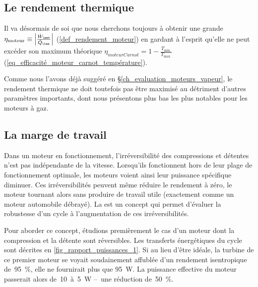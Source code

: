 	\subsection{Le rendement thermique}

		Il va désormais de soi que nous cherchons toujours à obtenir une grande  $\eta_\text{moteur} \equiv \left| \frac{\dot{W}_\net}{\dot{Q}_\inn} \right|$ (\ref{def_rendement_moteur}) en gardant à l’esprit qu’elle ne peut excéder son maximum théorique $\eta _{moteur Carnot} = 1 - \frac{T_\text{min.}}{T_\text{max.}}$ (\ref{eq_efficacité_moteur_carnot_température}).

		Comme nous l’avons déjà suggéré en \S\ref{ch_evaluation_moteurs_vapeur}, le rendement thermique ne doit toutefois pas être maximisé au détriment d’autres paramètres importants, dont nous présentons plus bas les plus notables pour les moteurs à gaz.

	\subsection{La marge de travail}
	\label{ch_rapport_des_puissances}

		Dans un moteur en fonctionnement, l’irréversibilité des compressions et détentes n’est pas indépendante de la vitesse. Lorsqu’ils fonctionnent hors de leur plage de fonctionnement optimale, les moteurs voient ainsi leur puissance spécifique diminuer. Ces irréversibilités peuvent même réduire le rendement à zéro, le moteur tournant alors sans produire de travail utile (exactement comme un moteur automobile débrayé). La  est un concept qui permet d’évaluer la robustesse d’un cycle à l’augmentation de ces irréversibilités.

		Pour aborder ce concept, étudions premièrement le cas d’un moteur dont la compression et la détente sont réversibles. Les transferts énergétiques du cycle sont décrites en \cref{fig_rapport_puissances_1}. Si au lieu d’être idéale, la turbine de ce premier moteur se voyait soudainement affublée d’un rendement isentropique de~\SI{95}{\percent}, elle ne fournirait plus que \SI{95}{\watt}. La puissance effective du moteur passerait alors de~\num{10}~à~\SI{5}{\watt} --\ une réduction de~\SI{50}{\percent}.

